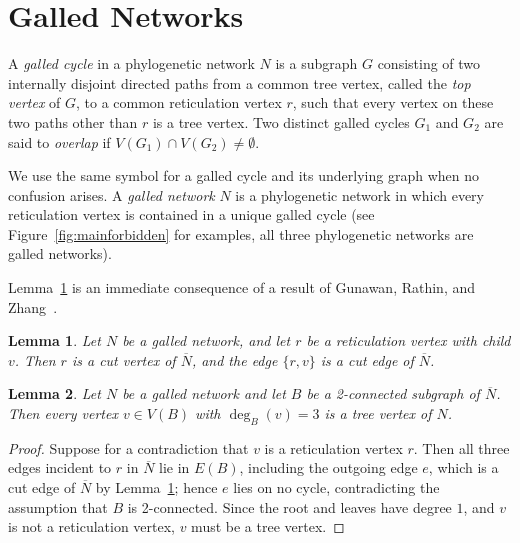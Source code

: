 \documentclass[pdflatex,sn-mathphys-num]{sn-jnl}
\theoremstyle{thmstyleone}%
\theoremstyle{thmstyletwo}%
\newtheorem{lemma}{Lemma}
\theoremstyle{thmstylethree}%
\begin{document}
\section{Galled Networks}  \label{sec:galled}

A \emph{galled cycle} in a phylogenetic network $N$ is a subgraph $G$ consisting of two internally disjoint directed paths from a common tree vertex, called the \emph{top vertex} of $G$, to a common reticulation vertex $r$, such that every vertex on these two paths other than $r$ is a tree vertex.
Two distinct galled cycles $G_1$ and $G_2$ are said to \emph{overlap} if $V(G_1) \cap V(G_2) \neq \emptyset$. 

We use the same symbol for a galled cycle and its underlying graph when no confusion arises. A \emph{galled network} $N$ is a phylogenetic network in which every reticulation vertex is contained in a unique galled cycle (see Figure~\ref{fig:mainforbidden} for examples, all three phylogenetic networks are galled networks). 





Lemma~\ref{lmm:retcutvertex} is an immediate consequence of a result of Gunawan, Rathin, and Zhang~\cite[Theorem~2.1(2)]{GuRaZh}.



\begin{lemma}\label{lmm:retcutvertex}
Let $N$ be a galled network, and let $r$ be a reticulation vertex with child $v$. Then $r$ is a cut vertex of $\overline{N}$, and the edge $\{r,v\}$ is a cut edge of $\overline{N}$.
\end{lemma}



\begin{lemma}\label{lmm:deg3-tree}
Let $N$ be a galled network and let $B$ be a 2-connected subgraph of 
$\overline{N}$. Then every vertex 
$v \in V(B)$ with $\deg_B(v) = 3$ is a tree vertex of $N$.
\end{lemma}

\begin{proof}
Suppose for a contradiction that $v$ is a reticulation vertex $r$. Then all three edges incident to $r$ in $\overline{N}$ lie in $E(B)$, including the outgoing edge $e$, which is a cut edge of $\overline{N}$ by Lemma~\ref{lmm:retcutvertex}; hence $e$ lies on no cycle, contradicting the assumption that $B$ is 2-connected. Since the root and leaves have degree $1$, and $v$ is not a reticulation vertex, $v$ must be a tree vertex.
\end{proof}
\end{document}
